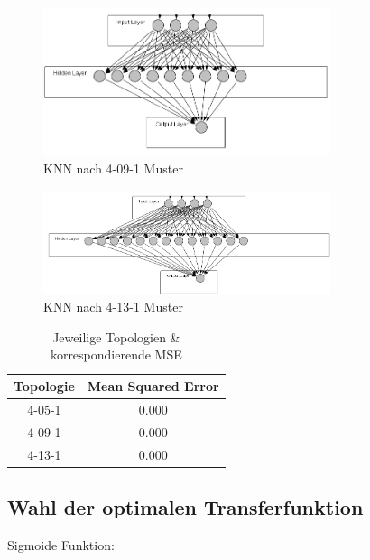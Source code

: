 \begin{figure}[H]
\centering
		\includegraphics[width=0.75\textwidth]{4-9-1.PNG}
	\caption{KNN nach 4-09-1 Muster}
	\label{fig:KNN nach 4-09-1 Muster}
\end{figure}



\begin{figure}[htbp]
\centering
		\includegraphics[width=0.75\textwidth]{4-13-1.PNG}
	\caption{KNN nach 4-13-1 Muster}
	\label{fig:KNN nach 4-13-1 Muster}
\end{figure}


\begin{table}
  \centering
  \begin{tabular}{|c|c|}
  \hline 
  \rule[0ex]{0pt}{2.5ex} Topologie & Mean Squared Error \\ 
  \hline 
  \rule[0ex]{0pt}{2.5ex} 4-05-1 & 0.000 \\ 
  \hline 
  \rule[0ex]{0pt}{2.5ex} 4-09-1 & 0.000 \\ 
  \hline 
  \rule[0ex]{0pt}{2.5ex} 4-13-1 & 0.000 \\ 
  \hline 
  \end{tabular} 
  \caption{Jeweilige Topologien \& korrespondierende MSE}
  \label{tab:myfirsttable}
\end{table}


\subsection{Wahl der optimalen Transferfunktion} %

Sigmoide Funktion:

